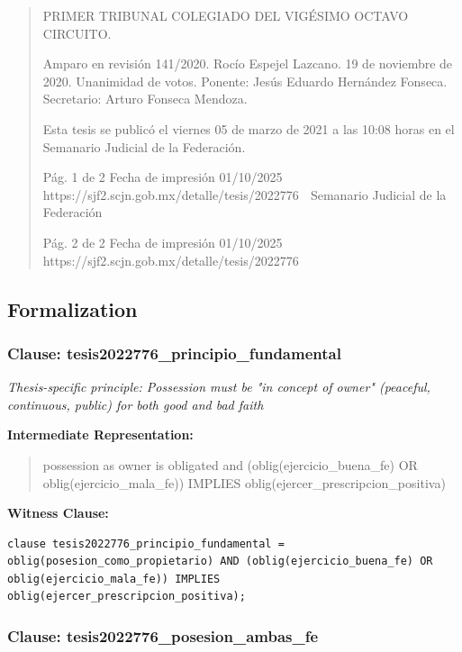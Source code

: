 \documentclass[11pt,a4paper]{article}
\begin{document}
\begin{quote}
PRIMER TRIBUNAL COLEGIADO DEL VIGÉSIMO OCTAVO CIRCUITO.


Amparo en revisión 141/2020. Rocío Espejel Lazcano. 19 de noviembre de 2020. Unanimidad de
votos. Ponente: Jesús Eduardo Hernández Fonseca. Secretario: Arturo Fonseca Mendoza.


Esta tesis se publicó el viernes 05 de marzo de 2021 a las 10:08 horas en el Semanario Judicial de
la Federación.




                                              Pág. 1 de 2             Fecha de impresión 01/10/2025
  https://sjf2.scjn.gob.mx/detalle/tesis/2022776
                                                 Semanario Judicial de la Federación




                                            Pág. 2 de 2       Fecha de impresión 01/10/2025
https://sjf2.scjn.gob.mx/detalle/tesis/2022776

\end{quote}

\subsection{Formalization}

\subsubsection{Clause: tesis2022776\_principio\_fundamental}

\textit{Thesis-specific principle: Possession must be "in concept of owner" (peaceful, continuous, public) for both good and bad faith}

\textbf{Intermediate Representation:}

\begin{quote}
possession as owner is obligated and (oblig(ejercicio\_buena\_fe) OR oblig(ejercicio\_mala\_fe)) IMPLIES oblig(ejercer\_prescripcion\_positiva)
\end{quote}

\textbf{Witness Clause:}

\begin{lstlisting}[style=witnessstyle, language=Witness]
clause tesis2022776_principio_fundamental = oblig(posesion_como_propietario) AND (oblig(ejercicio_buena_fe) OR oblig(ejercicio_mala_fe)) IMPLIES oblig(ejercer_prescripcion_positiva);
\end{lstlisting}

\subsubsection{Clause: tesis2022776\_posesion\_ambas\_fe}
\end{document}
